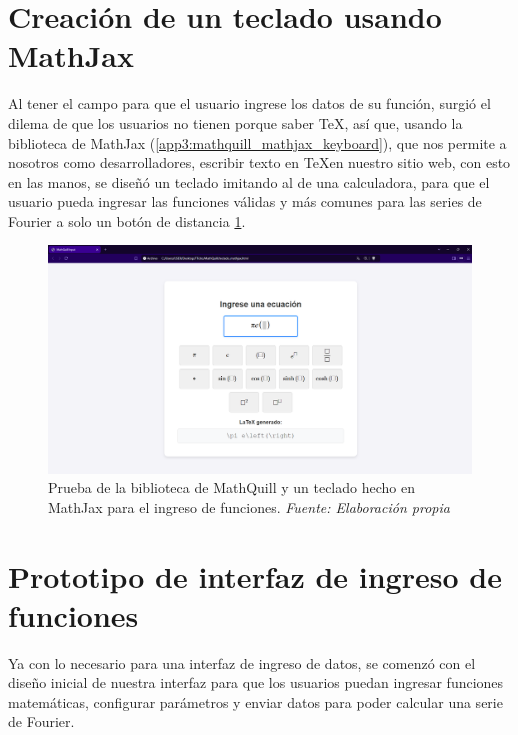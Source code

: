 \section{Creación de un teclado usando MathJax}
Al tener el campo para que el usuario ingrese los datos de su función, surgió el dilema de que los usuarios no tienen porque saber \TeX, así que, usando la biblioteca de MathJax (\ref{app3:mathquill_mathjax_keyboard}), que nos permite a nosotros como desarrolladores, escribir texto en \TeX en nuestro sitio web, con esto en las manos, se diseñó un teclado imitando al de una calculadora, para que el usuario pueda ingresar las funciones válidas y más comunes para las series de Fourier a solo un botón de distancia \ref{fig:prueba_mathquill_mathjax}.

\begin{figure}[H]
	\centering
	\includegraphics[width=1\textwidth]{img/chapter06/prueba_mathquill_mathjax.png}
	\caption[Prueba de la biblioteca de MathQuill y un teclado hecho en MathJax para el ingreso de funciones.]{Prueba de la biblioteca de MathQuill y un teclado hecho en MathJax para el ingreso de funciones. \textit{Fuente: Elaboración propia}}
	\label{fig:prueba_mathquill_mathjax}
\end{figure}

\section{Prototipo de interfaz de ingreso de funciones}
Ya con lo necesario para una interfaz de ingreso de datos, se comenzó con el diseño inicial de nuestra interfaz para que los usuarios puedan ingresar funciones matemáticas, configurar parámetros y enviar datos para poder calcular una serie de Fourier.

